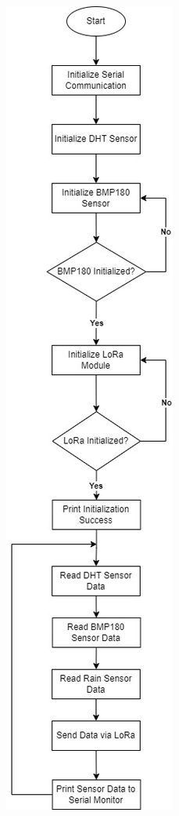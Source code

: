 \documentclass[conference, onecolumn]{IEEEtran}
\begin{document}
\begin{figure}[H]
    \centering
    \begin{subfigure}{0.45\textwidth}
        \centering
        \includegraphics[width=0.45\linewidth]{figures/Weather_Station-Arduino_Flowchart.jpg}

\end{subfigure}
\end{figure}
\end{document}
